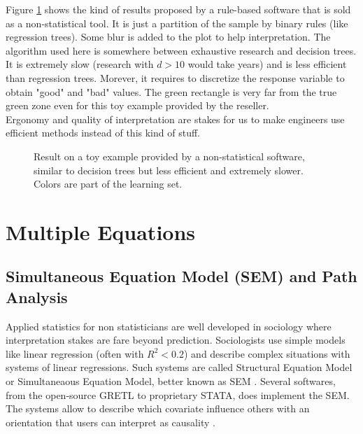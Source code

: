 \documentclass[12pt,a4paper]{report}
\begin{document}
			Figure \ref{Regle2D} shows the kind of results proposed by a rule-based software that is sold as a non-statistical tool. It is just a partition of the sample by binary rules (like regression trees). Some blur is added to the plot to help interpretation. The algorithm used here is somewhere between exhaustive research and decision trees. It is extremely slow (research with $d>10$ would take years) and is less efficient than regression trees. Morever, it requires to discretize the response variable to obtain "good" and "bad" values. The green rectangle is very far from the true green zone even for this toy example provided by the reseller.\\
			
			Ergonomy and quality of interpretation are stakes for us to make engineers use efficient methods instead of this kind of stuff.
	
		\begin{figure}[h!]
	 \quad
	\caption{Result on a toy example provided by a non-statistical software, similar to decision trees but less efficient and extremely slower. Colors are part of the learning set.}\label{Regle2D}
\end{figure}	
			
	\section{Multiple Equations}		%
		
		\subsection{Simultaneous Equation Model (SEM) and Path Analysis}		%
		Applied statistics  for non statisticians are well developed in sociology where interpretation  stakes are fare beyond prediction. Sociologists use simple models like linear regression (often with $R^2<0.2$) and describe complex situations with systems of linear regressions. Such systems are called Structural Equation Model or Simultaneaous Equation Model, better known as SEM \cite{davidson1993estimation}. Several softwares, from the open-source GRETL \cite{CottrellLucchetti2007gretlmanual} to proprietary STATA, does implement the SEM. The systems allow to describe which covariate influence others with an orientation that users can interpret as causality \cite{pearl2000causality,pearl1998graphs}. \\
		
\end{document}
